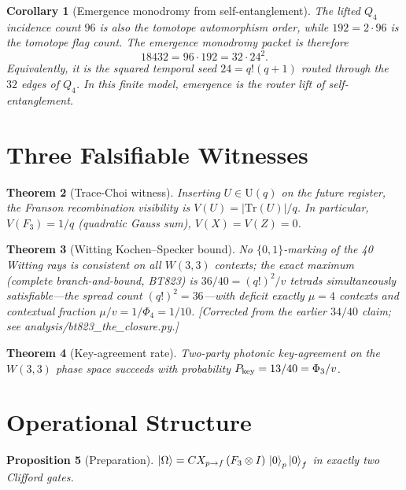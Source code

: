 \documentclass[11pt]{article}
\newtheorem{theorem}{Theorem}
\newtheorem{proposition}[theorem]{Proposition}
\newtheorem{corollary}[theorem]{Corollary}
\begin{document}
\begin{corollary}[Emergence monodromy from self-entanglement]\label{cor:q4_monodromy}
The lifted $Q_4$ incidence count $96$ is also the tomotope automorphism
order, while $192=2\cdot96$ is the tomotope flag count.  The emergence
monodromy packet is therefore
\[
  18432 = 96\cdot192 = 32\cdot24^2.
\]
Equivalently, it is the squared temporal seed $24=q!(q+1)$ routed
through the $32$ edges of $Q_4$.  In this finite model, emergence is the
router lift of self-entanglement.
\end{corollary}

\section{Three Falsifiable Witnesses}

\begin{theorem}[Trace-Choi witness]\label{thm:trace}
Inserting $U\in\mathrm{U}(q)$ on the future register, the Franson
recombination visibility is $V(U) = |\mathrm{Tr}(U)|/q$.  In particular,
$V(F_3) = 1/q$ (quadratic Gauss sum), $V(X) = V(Z) = 0$.
\end{theorem}

\begin{theorem}[Witting Kochen--Specker bound]\label{thm:KS}
No $\{0,1\}$-marking of the 40 Witting rays is consistent on all $W(3,3)$
contexts; the exact maximum (complete branch-and-bound, BT823) is
$36/40 = (q!)^2/v$ tetrads simultaneously satisfiable---the spread count
$(q!)^2 = 36$---with deficit exactly $\mu = 4$ contexts and contextual
fraction $\mu/v = 1/\Phi_4 = 1/10$.  [Corrected from the earlier
$34/40$ claim; see analysis/bt823\_the\_closure.py.]
\end{theorem}

\begin{theorem}[Key-agreement rate]\label{thm:key}
Two-party photonic key-agreement on the $W(3,3)$ phase space succeeds
with probability $P_{\rm key} = 13/40 = \Phi_3/v$.
\end{theorem}

\section{Operational Structure}

\begin{proposition}[Preparation]\label{prop:prep}
$\ket{\Omega} = CX_{p\to f}\,(F_3 \otimes I)\,\ket{0}_p\ket{0}_f$ in
exactly two Clifford gates.
\end{proposition}
\end{document}
